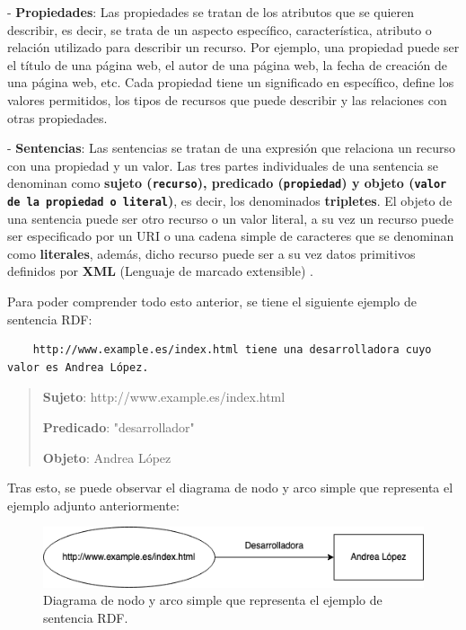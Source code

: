 \documentclass[11pt]{report}
\begin{document}
	- \textbf{Propiedades}: Las propiedades se tratan de los atributos que se quieren describir, es decir, se trata de un aspecto específico, característica, atributo o relación utilizado para describir un recurso. Por ejemplo, una propiedad puede ser el título de una página web, el autor de una página web, la fecha de creación de una página web, etc.  Cada propiedad tiene un significado en específico, define los valores permitidos, los tipos de recursos que puede describir y las relaciones con otras propiedades.

	- \textbf{Sentencias}: Las sentencias se tratan de una expresión que relaciona un recurso con una propiedad y un valor. Las tres partes individuales de una sentencia se denominan como \textbf{sujeto (\texttt{recurso}), predicado (\texttt{propiedad}) y objeto (\texttt{valor de la propiedad o literal})}, es decir, los denominados \textbf{tripletes}. El objeto de una sentencia puede ser otro recurso o un valor literal, a su vez un recurso puede ser especificado por un URI o una cadena simple de caracteres que se denominan como \textbf{literales}, además, dicho recurso puede ser a su vez datos primitivos definidos por \textbf{XML} (Lenguaje de marcado extensible) \cite{6}. 

Para poder comprender todo esto anterior, se tiene el siguiente ejemplo de sentencia RDF:

\begin{verbatim}
	http://www.example.es/index.html tiene una desarrolladora cuyo valor es Andrea López.
\end{verbatim}

\begin{quote}
	\textbf{Sujeto}: http://www.example.es/index.html

	\textbf{Predicado}: "desarrollador"

	\textbf{Objeto}: Andrea López 
\end{quote}	

	Tras esto, se puede observar el diagrama de nodo y arco simple que representa el ejemplo adjunto anteriormente:

	\begin{figure}[H]
		\centering
		\includegraphics[scale=0.7]{../img/Diagrama-Nodo-Arco.png}
		\caption{Diagrama de nodo y arco simple que representa el ejemplo de sentencia RDF.}
		\label{fig:Diagrama-Nodo-Arco}
	\end{figure}
\end{document}
